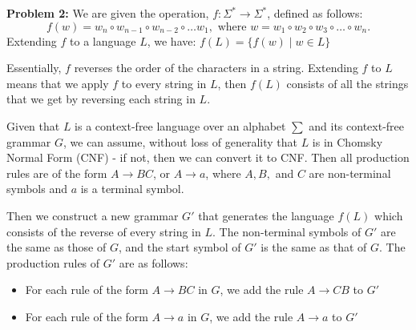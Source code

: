 \documentclass[addpoints]{exam}
\begin{document}
\begin{questions}
\begin{solution}

    \newpage
    \textbf{Problem 2:}
    We are given the operation, $f:\Sigma^*\to\Sigma^*$, defined as follows:
    \[ f(w) = w_n\circ w_{n-1}\circ w_{n-2}\circ\ldots w_{1}, \text{ where } w = w_1\circ w_2\circ w_3\circ\ldots\circ w_n. \]
    Extending $f$ to a language $L$, we have: $ f(L) = \{ f(w) \mid w \in L \} $

    Essentially, $f$ reverses the order of the characters in a string. Extending $f$ to $L$ means that we apply $f$ to every string in $L$, then $f(L)$ consists of all the strings that we get by reversing each string in $L$.

    Given that $L$ is a context-free language over an alphabet $\sum$ and its context-free grammar $G$, we can assume, without loss of generality that $L$ is in Chomsky Normal Form (CNF) - if not, then we can convert it to CNF. Then all production rules are of the form $ A \rightarrow BC $, or $ A \rightarrow a $, where $ A, B, $ and $C$ are non-terminal symbols and $a$ is a terminal symbol.

    Then we construct a new grammar $G'$ that generates the language $f(L)$ which consists of the reverse of every string in $L$. The non-terminal symbols of $G'$ are the same as those of $G$, and the start symbol of $G'$ is the same as that of $G$. The production rules of $G'$ are as follows:
    \begin{itemize}
      \item For each rule of the form $ A \rightarrow BC $ in $G$, we add the rule $ A \rightarrow CB $ to $G'$
      \item For each rule of the form $ A \rightarrow a $ in $G$, we add the rule $ A \rightarrow a $ to $G'$
    \end{itemize}


\end{solution}
\end{questions}
\end{document}
